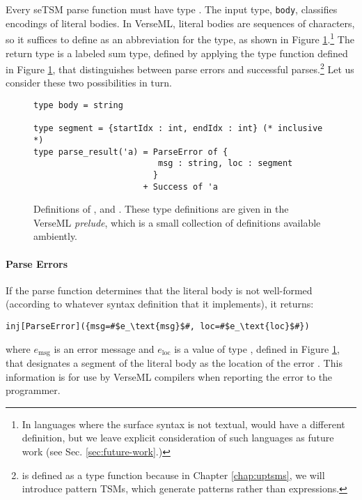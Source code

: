 Every seTSM parse function must have type . The input type, \lstinline{body}, classifies encodings of literal {bodies}. In VerseML, literal bodies are sequences of characters, so it suffices to define  as an abbreviation for the  type, as shown in Figure \ref{fig:indexrange-and-parseresult}.\footnote{In languages where the surface syntax is not textual,  would have a different definition, but we leave explicit consideration of such languages as future work (see Sec. \ref{sec:future-work}.)} The return type is a labeled sum type, defined by applying the type function  defined in Figure \ref{fig:indexrange-and-parseresult}, that distinguishes between parse errors and successful parses.\footnote{ is defined as a type function because in Chapter \ref{chap:uptsms}, we will introduce pattern TSMs, which generate patterns rather than expressions.} Let us consider these two possibilities in turn.
\begin{figure}
\begin{lstlisting}[numbers=none]
type body = string

type segment = {startIdx : int, endIdx : int} (* inclusive *)
type parse_result('a) = ParseError of {
                         msg : string, loc : segment
                        }
                      + Success of 'a 
\end{lstlisting}
\caption[Definitions of ,  and  in VerseML]{Definitions of ,  and . These type definitions are given in the VerseML \emph{prelude}, which is a small collection of definitions available ambiently.}
\label{fig:indexrange-and-parseresult}
\end{figure}

\paragraph{Parse Errors} If the parse function determines that the literal body is not well-formed (according to whatever syntax definition that it implements), it returns:
\begin{lstlisting}[numbers=none]
inj[ParseError]({msg=#$e_\text{msg}$#, loc=#$e_\text{loc}$#})
\end{lstlisting}
where $e_\text{msg}$ is an error message and $e_\text{loc}$ is a value of type , defined in Figure \ref{fig:indexrange-and-parseresult}, that designates a segment of the literal body as the location of the error \cite{DBLP:journals/jsc/DeursenKT93}. This information is for use by VerseML compilers when reporting the error to the programmer.

